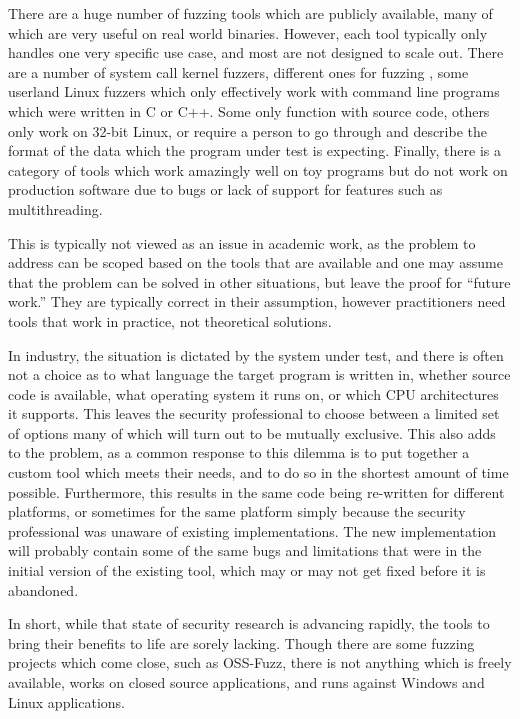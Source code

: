 There are a huge number of fuzzing tools which are publicly available, many of
which are very useful on real world binaries.  However, each tool
typically only handles one very specific use case, and most are not designed to scale
out.  There are a number of system call kernel fuzzers, different ones for
fuzzing \IOCTLs{}, some userland Linux fuzzers which only effectively work with
command line programs which were written in C or C++.  Some only function with
source code, others only work on 32-bit Linux, or require a person to go
through and describe the format of the data which the program under test is
expecting.  Finally, there is a category of tools which work amazingly well
on toy programs but do not work on production software due to bugs or lack of
support for features such as multithreading.

This is typically not viewed as an issue in academic work, as the problem to address can be
scoped based on the tools that are available and one may assume that the problem can
be solved in other situations, but leave the proof for ``future work.''  They
are typically correct in their assumption, however practitioners need tools
that work in practice, not theoretical solutions.

In industry, the situation is dictated by the system under test,
and there is often not a choice as to what language the target program is
written in, whether source code is available, what operating system it runs
on, or which CPU architectures it supports. This leaves the security
professional to choose between a limited set of options many of which will
turn out to be mutually exclusive. This also adds to the problem, as a common
response to this dilemma is to put together a custom tool which meets their
needs, and to do so in the shortest amount of time possible.  Furthermore,
this results in the same code being re-written for different platforms, or
sometimes for the same platform simply because the security professional was
unaware of existing implementations.  The new implementation will probably
contain some of the same bugs and limitations that were in the initial
version of the existing tool, which may or may not get fixed before it is
abandoned.

In short, while that state of security research is advancing rapidly, the
tools to bring their benefits to life are sorely lacking.  Though there are some
fuzzing projects which come close, such as OSS-Fuzz,\cite{ossfuzz} there
is not anything which is freely available, works on closed source applications,
and runs against Windows and Linux applications.
